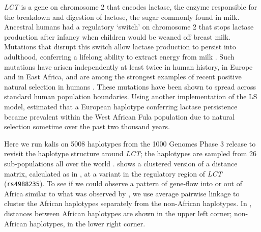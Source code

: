 \documentclass[pdflatex,referee,lineno,sn-nature]{sn-jnl}%
\newcommand{\pkg}[1]{{\fontseries{m}\fontseries{b}\selectfont #1}}
\begin{document}
\emph{LCT} is a gene on chromosome 2 that encodes lactase, the enzyme responsible for the breakdown and digestion of lactose, the sugar commonly found in milk.
Ancestral humans had a regulatory `switch' on chromosome 2 that stops lactase production after infancy when children would be weaned off breast milk.
Mutations that disrupt this switch allow lactase production to persist into adulthood, conferring a lifelong ability to extract energy from milk \cite{ingram2009lactose}.
Such mutations have arisen independently at least twice in human history, in Europe and in East Africa, and are among the strongest examples of recent positive natural selection in humans \cite{ranciaro2014genetic, bersaglieri2004genetic}.
These mutations have been shown to spread across standard human population boundaries.
Using another implementation of the LS model, \cite{busby2017inferring} estimated that a European haplotype conferring lactase persistence became prevalent within the West African Fula population due to natural selection sometime over the past two thousand years.

Here we run \pkg{kalis} on 5008 haplotypes from the 1000 Genomes Phase 3 release to revisit the haplotype structure around \emph{LCT}; the haplotypes are sampled from 26 sub-populations all over the world \cite{10002015global}.
 shows a clustered version of a distance matrix, calculated as in , at a variant in the regulatory region of \emph{LCT} (\texttt{rs4988235}).
To see if we could observe a pattern of gene-flow into or out of Africa similar to what was observed by \cite{busby2017inferring}, we use average pairwise linkage \cite{sokal1958statistical} to cluster the African haplotypes separately from the non-African haplotypes.
In , distances between African haplotypes are shown in the upper left corner; non-African haplotypes, in the lower right corner.
\end{document}
